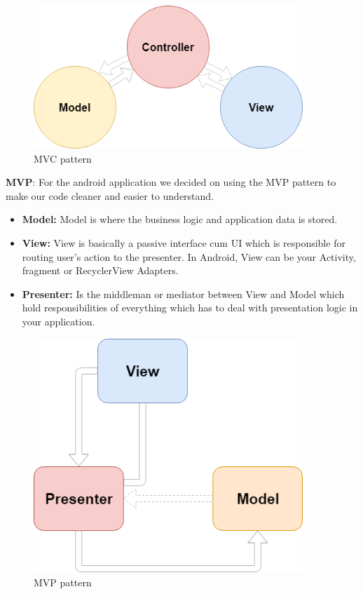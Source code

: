 \documentclass[12pt,a4paper]{report}
\begin{document}
\begin{figure}[H]
	\centering
	\includegraphics[width=4in,keepaspectratio]{mvc_pattern.png}
	\caption{MVC pattern}
	\label{mvc}
\end{figure}
\textbf{MVP}: For the android application we decided on using the MVP pattern to make our code cleaner and easier to understand. \par 
\begin{itemize}
	\item \textbf{Model:} Model is where the business logic and application data is stored.
	\item \textbf{View:} View is basically a passive interface cum UI which is responsible for routing user’s action to the presenter. In Android, View can be your Activity, fragment or RecyclerView Adapters.
	\item \textbf{Presenter:} Is the middleman or mediator between View and Model which hold responsibilities of everything which has to deal with presentation logic in your application.
\end{itemize}
\begin{figure}[H]
	\centering
	\includegraphics[width=4in,keepaspectratio]{mvp-patern.png}
	\caption{MVP pattern}
	\label{mvp}
\end{figure}
\end{document}

